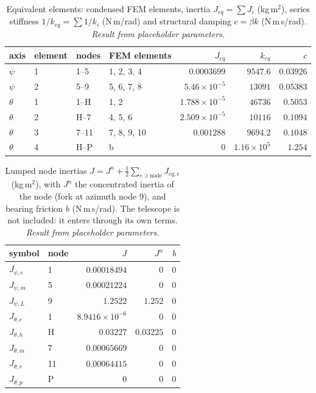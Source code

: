 \documentclass[10pt,a4paper]{article}
\numberwithin{equation}{section}
\begin{document}
\begin{table}[H]\centering\small
\caption{Equivalent elements: condensed FEM elements, inertia $J_{eq} = \sum J_i$ (kg\,m$^2$), series stiffness $1/k_{eq} = \sum 1/k_i$ (N\,m/rad) and structural damping $c = \beta k$ (N\,m\,s/rad). \emph{Result from placeholder parameters.}}\label{tab:lump_elements}
\begin{tabular}{llllrrr}\toprule
axis & element & nodes & FEM elements & $J_{eq}$ & $k_{eq}$ & $c$ \\ \midrule
$\psi$ & 1 & 1--5 & 1, 2, 3, 4 & $0.0003699$ & $9547.6$ & $0.03926$ \\
$\psi$ & 2 & 5--9 & 5, 6, 7, 8 & $5.46\times10^{-5}$ & $13091$ & $0.05383$ \\
$\theta$ & 1 & 1--H & 1, 2 & $1.788\times10^{-5}$ & $46736$ & $0.5053$ \\
$\theta$ & 2 & H--7 & 4, 5, 6 & $2.509\times10^{-5}$ & $10116$ & $0.1094$ \\
$\theta$ & 3 & 7--11 & 7, 8, 9, 10 & $0.001288$ & $9694.2$ & $0.1048$ \\
$\theta$ & 4 & H--P & b & $0$ & $1.16\times10^{5}$ & $1.254$ \\
\bottomrule\end{tabular}\end{table}
\begin{table}[H]\centering\small
\caption{Lumped node inertias $J = J^n + \tfrac12\sum_{e\ni\text{node}}J_{eq,e}$ (kg\,m$^2$), with $J^n$ the concentrated inertia of the node (fork at azimuth node 9), and bearing friction $b$ (N\,m\,s/rad). The telescope is not included: it enters through its own terms. \emph{Result from placeholder parameters.}}\label{tab:lump_nodes}
\begin{tabular}{llrrr}\toprule
symbol & node & $J$ & $J^n$ & $b$ \\ \midrule
$J_{\psi,e}$ & 1 & $0.00018494$ & $0$ & $0$ \\
$J_{\psi,m}$ & 5 & $0.00021224$ & $0$ & $0$ \\
$J_{\psi,L}$ & 9 & $1.2522$ & $1.252$ & $0$ \\
$J_{\theta,e}$ & 1 & $8.9416\times10^{-6}$ & $0$ & $0$ \\
$J_{\theta,h}$ & H & $0.03227$ & $0.03225$ & $0$ \\
$J_{\theta,m}$ & 7 & $0.00065669$ & $0$ & $0$ \\
$J_{\theta,r}$ & 11 & $0.00064415$ & $0$ & $0$ \\
$J_{\theta,p}$ & P & $0$ & $0$ & $0$ \\
\bottomrule\end{tabular}\end{table}
\end{document}
